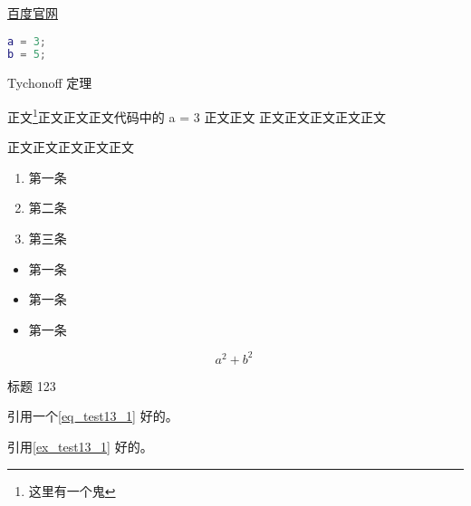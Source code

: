 

\begin{issues}
\issueDraft
\end{issues}

\href{http://www.baidu.com}{百度官网}


\begin{lstlisting}[language=matlab]
a = 3;
b = 5;
\end{lstlisting}

Tychonoff 定理 %

正文\footnote{这里有一个鬼}正文正文正文代码中的 a = 3 正文正文\cite{Cui1}
正文正文正文正文正文

正文正文正文正文正文

\begin{enumerate}
\item 第一条
\item 第二条
\item 第三条
\end{enumerate}

\begin{itemize}
\item 第一条
\item 第一条
\item 第一条
\end{itemize}


\begin{equation}\label{eq_test13_1}
a^2+b^2~
\end{equation}

\begin{example}{标题}\label{ex_test13_1}
123
\end{example}

引用一个\autoref{eq_test13_1} 好的。

引用\autoref{ex_test13_1} 好的。
